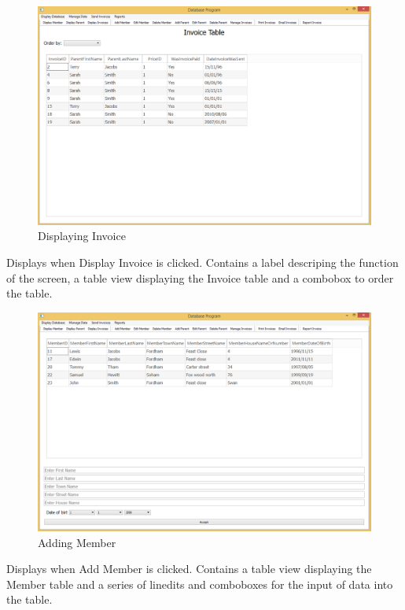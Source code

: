 \begin{figure}[H]
\includegraphics[width=\textwidth]{./Maintenance/Images/DisplayInvoice.png}
    \caption{Displaying Invoice} \label{fig:display_invoice}
\end{figure}

Displays when Display Invoice is clicked. Contains a label descriping the function of the screen, a table view displaying the Invoice table and a combobox to order the table.

\begin{figure}[H]
\includegraphics[width=\textwidth]{./Maintenance/Images/AddMember.png}
    \caption{Adding Member} \label{fig:add_member}
\end{figure}

Displays when Add Member is clicked. Contains a table view displaying the Member table and a series of linedits and comboboxes for the input of data into the table.

